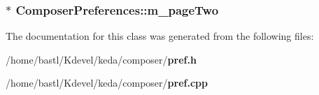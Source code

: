 \subsubsection{$\ast$ {\bf Composer\-Preferences::m\_\-page\-Two}\hspace{0.3cm}{\tt  [private]}}\label{classComposerPreferences_e415a6a2699c0a2f7a450bc0d877b64c}




The documentation for this class was generated from the following files:\begin{CompactItemize}
\item 
/home/bastl/Kdevel/keda/composer/{\bf pref.h}\item 
/home/bastl/Kdevel/keda/composer/{\bf pref.cpp}\end{CompactItemize}
